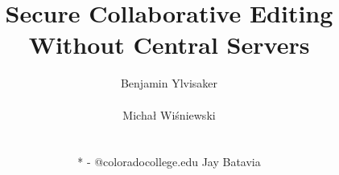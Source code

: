 \documentclass{sig-alternate-hotpets}
\begin{document}
\title{Secure Collaborative Editing Without Central Servers}
%
%
%
%
%

%
\author{
%
%
\alignauthor
Benjamin Ylvisaker\\
       \\
\alignauthor
Micha\l{} Wi{\'s}niewski\\
       \\
       \\
       \vspace{0.2cm}
       * - @coloradocollege.edu
\alignauthor
Jay Batavia\\
       \\
}
\end{document}
